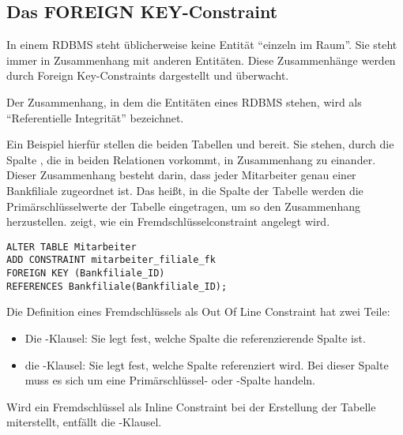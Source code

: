       \subsection{Das FOREIGN KEY-Constraint}
        \label{refint}
        In einem RDBMS steht \"ublicherweise keine Entit\"at \enquote{einzeln im Raum}. Sie steht immer in Zusammenhang mit anderen Entit\"aten. Diese Zusammenh\"ange werden durch Foreign Key-Constraints dargestellt und \"uberwacht.
        \begin{merke}
          Der Zusammenhang, in dem die Entit\"aten eines RDBMS stehen, wird als \enquote{Referentielle Integrit\"at} bezeichnet.
        \end{merke}
        Ein Beispiel hierf\"ur stellen die beiden Tabellen  und  bereit. Sie stehen, durch die Spalte , die in beiden Relationen vorkommt, in Zusammenhang zu einander. Dieser Zusammenhang besteht darin, dass jeder Mitarbeiter genau einer Bankfiliale zugeordnet ist. Das hei\ss{}t,  in die Spalte  der Tabelle  werden die Prim\"arschl\"usselwerte der Tabelle  eingetragen, um so den Zusammenhang herzustellen.
         zeigt, wie ein Fremdschl\"usselconstraint angelegt wird.
\clearpage
        \begin{lstlisting}[language=oracle_sql,caption={Ein Foreign Key-Constraint als Out Of Line Constraint anlegen},label=sql09_15]
ALTER TABLE Mitarbeiter
ADD CONSTRAINT mitarbeiter_filiale_fk
FOREIGN KEY (Bankfiliale_ID)
REFERENCES Bankfiliale(Bankfiliale_ID);
        \end{lstlisting}
        Die Definition eines Fremdschl\"ussels als Out Of Line Constraint hat zwei Teile:
        \begin{itemize}
          \item Die -Klausel: Sie legt fest, welche Spalte die referenzierende Spalte ist.
          \item die -Klausel: Sie legt fest, welche Spalte referenziert wird. Bei dieser Spalte muss es sich um eine Prim\"arschl\"ussel- oder \UNIQUE-Spalte handeln.
        \end{itemize}
        \begin{merke}
          Wird ein Fremdschl\"ussel als Inline Constraint bei der Erstellung der Tabelle miterstellt, entf\"allt die -Klausel.
        \end{merke}
